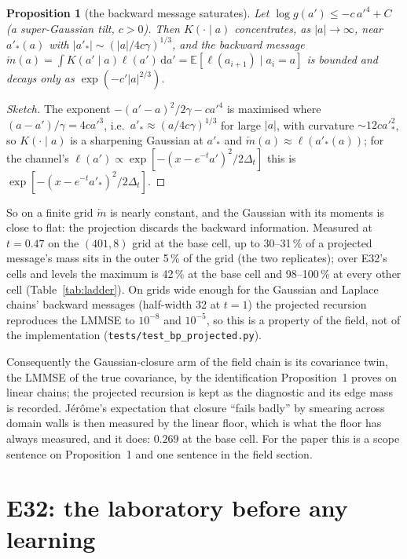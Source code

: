\documentclass[10pt,a4paper]{article}
\newcommand{\code}[1]{\texttt{\small #1}}
\newcommand{\E}{\mathbb{E}}
\newcommand{\dd}{\,\mathrm{d}}
\theoremstyle{plain}
\newtheorem{proposition}{Proposition}
\theoremstyle{remark}
\begin{document}
\begin{proposition}[the backward message saturates]
Let $\log g(a')\le -c\,a'^4+C$ (a super-Gaussian tilt, $c>0$). Then $K(\cdot\mid a)$ concentrates, as
$|a|\to\infty$, near $a'_*(a)$ with $|a'_*|\sim(|a|/4c\gamma)^{1/3}$, and the backward message
$\overleftarrow m(a)=\int K(a'\mid a)\ell(a')\dd a'=\E[\ell(a_{i+1})\mid a_i=a]$ is bounded and decays only as
$\exp(-c'|a|^{2/3})$.
\end{proposition}
\begin{proof}[Sketch]
The exponent $-(a'-a)^2/2\gamma-ca'^4$ is maximised where $(a-a')/\gamma=4ca'^3$, i.e.\ $a'_*\approx(a/4c\gamma)^{1/3}$
for large $|a|$, with curvature $\sim12ca'^2_*$, so $K(\cdot\mid a)$ is a sharpening Gaussian at $a'_*$ and
$\overleftarrow m(a)\approx\ell(a'_*(a))$; for the channel's $\ell(a')\propto\exp[-(x-e^{-t}a')^2/2\Delta_t]$ this is $\exp[-(x-e^{-t}a'_*)^2/2\Delta_t]$.
\end{proof}
So on a finite grid $\overleftarrow m$ is nearly constant, and the Gaussian with its moments is close to flat: the
projection discards the backward information. Measured at $t=0.47$ on the $(401,8)$ grid at the base cell,
up to 30--31\,\% of a projected message's mass sits in the outer 5\,\% of the grid (the two replicates); over E32's cells and levels the
maximum is 42\,\% at the base cell and 98--100\,\% at every other cell (Table~\ref{tab:ladder}). On
grids wide enough for the Gaussian and Laplace chains' backward messages (half-width 32 at $t=1$)
the projected recursion reproduces the LMMSE to $10^{-8}$ and $10^{-5}$, so this is a property of the
field, not of the implementation (\code{tests/test\_bp\_projected.py}).

Consequently the Gaussian-closure arm of the field chain is its covariance twin, the LMMSE of the
true covariance, by the identification Proposition~1 proves on linear chains; the projected
recursion is kept as the diagnostic and its edge mass is recorded. Jérôme's expectation that closure
``fails badly'' by smearing across domain walls is then measured by the linear floor, which is what
the floor has always measured, and it does: $0.269$ at the base cell. For the paper this is a
scope sentence on Proposition~1 and one sentence in the field section.

\section{E32: the laboratory before any learning}\label{sec:e32}
\end{document}
